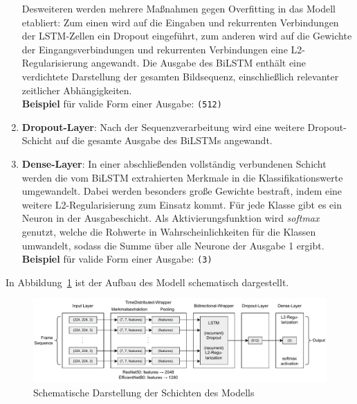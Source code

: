 \documentclass{article}
\begin{document}
\begin{enumerate}
        Desweiteren werden mehrere Maßnahmen gegen Overfitting in das Modell etabliert:
        Zum einen wird auf die Eingaben und rekurrenten Verbindungen der LSTM-Zellen ein Dropout eingeführt, zum anderen wird auf die Gewichte der Eingangsverbindungen und rekurrenten Verbindungen eine L2-Regularisierung angewandt.
        Die Ausgabe des BiLSTM enthält eine verdichtete Darstellung der gesamten Bildsequenz, einschließlich relevanter zeitlicher Abhängigkeiten. 
        \\\textbf{Beispiel} für valide Form einer Ausgabe: \texttt{(512)}
    \item\textbf{Dropout-Layer}:
        Nach der Sequenzverarbeitung wird eine weitere Dropout-Schicht auf die gesamte Ausgabe des BiLSTMs angewandt.
    \item\textbf{Dense-Layer}:
        In einer abschließenden vollständig verbundenen Schicht werden die vom BiLSTM extrahierten Merkmale in die Klassifikationswerte umgewandelt.
        Dabei werden besonders große Gewichte bestraft, indem eine weitere L2-Regularisierung zum Einsatz kommt.
        Für jede Klasse gibt es ein Neuron in der Ausgabeschicht.
        Als Aktivierungsfunktion wird \textit{softmax} genutzt, welche die Rohwerte in Wahrscheinlichkeiten für die Klassen umwandelt, sodass die Summe über alle Neurone der Ausgabe 1 ergibt.
        \\\textbf{Beispiel} für valide Form einer Ausgabe: \texttt{(3)}
\end{enumerate}
In Abbildung~\ref{fig:model} ist der Aufbau des Modell schematisch dargestellt.
\begin{figure}[!h]
    \centering
    \includegraphics[width=\textwidth]{model.pdf}
    \caption{Schematische Darstellung der Schichten des Modells}
    \label{fig:model}
\end{figure}
    
\end{document}
